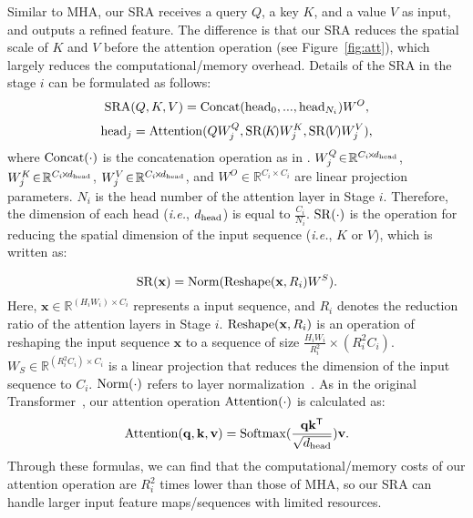 \documentclass[10pt,twocolumn,letterpaper]{article}
\def\ie{\emph{i.e.}}
\begin{document}
Similar to MHA, our SRA receives a query $Q$, a key $K$, and a value $V$ as input, and outputs a refined feature.
%
The difference is that our SRA reduces the spatial scale of $K$ and $V$ before the attention operation (see Figure~\ref{fig:att}), which largely reduces the computational/memory overhead.
%
Details of the SRA in the stage $i$ can be formulated as follows:
\begin{equation}
    {\rm SRA}(Q, K, V) = {\rm Concat}({\rm head}_0,... , {\rm head}_{N_i})W^O,
    \label{eqn:att1}
\end{equation}
\begin{equation}
    {\rm head}_j={\rm Attention}(QW_j^Q, {\rm SR}(\!K\!)W_j^K, {\rm SR}(\!V\!)W_j^V),
    \label{eqn:att2}
\end{equation}
where ${\rm Concat}(\cdot)$ is the concatenation operation as in \cite{vaswani2017attention}. $W_j^Q\!\in\!\mathbb{R}^{C_i\!\times\!d_{\rm head}}$,
$W_j^K\!\in\!\mathbb{R}^{C_i\!\times\!d_{\rm head}}$,
$W_j^V\!\in\!\mathbb{R}^{C_i\!\times\!d_{\rm head}}$, and
$W^O\!\in\!\mathbb{R}^{C_i\!\times\!C_i}$
are linear projection  parameters. 
%
$N_i$ is the head number of the attention layer in Stage $i$. 
%
Therefore, the dimension of each head (\ie, $d_{\rm head}$) is equal to $\frac{C_i}{N_i}$.
%
${\rm SR}(\cdot)$ is the operation for reducing the spatial dimension of the input sequence (\ie, $K$ or $V$), which is written as:
 
\begin{equation}
    {\rm SR}(\mathbf{x}) = {\rm Norm}({\rm Reshape}(\mathbf{x}, R_i)W^S).
    \label{eqn:att4}
\end{equation}
Here, $\mathbf{x}\!\in\!\mathbb{R}^{(H_iW_i)\!\times\!C_i}$ represents a input sequence, and $R_i$ denotes the reduction ratio of the attention layers in Stage $i$.
%
${\rm Reshape}(\mathbf{x}, R_i)$ is an operation of reshaping the input sequence $\mathbf{x}$
to a sequence of size $\frac{H_iW_i}{R_i^2}\!\times\!(R_i^2C_i)$.
%
$W_S\!\in\!\mathbb{R}^{(R_i^2C_i)\!\times\!C_i}$
is a linear projection that reduces the dimension of the input sequence to $C_i$. ${\rm Norm}(\cdot)$ refers to layer normalization~\cite{ba2016layer}.
%
As in the original Transformer~\cite{vaswani2017attention},
our attention operation ${\rm Attention}(\cdot)$ is calculated as:
\begin{equation}
    {\rm Attention}(\mathbf{q}, \mathbf{k}, \mathbf{v}) = {\rm Softmax}(\frac{\mathbf{q}\mathbf{k}^\mathsf{T}}{\sqrt{d_{\rm head}}})\mathbf{v}.
    \label{eqn:att3}
\end{equation}
Through these formulas, we can find that the computational/memory costs of our attention operation are $R_i^2$ times lower than those of MHA, so our SRA can handle larger input feature maps/sequences with limited resources.
\end{document}
